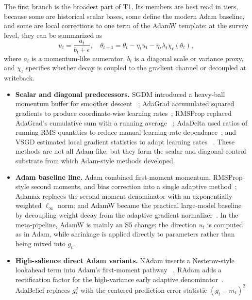 The first branch is the broadest part of T1.  Its members are best read in
tiers, because some are historical scalar bases, some define the modern Adam
baseline, and some are local corrections to one term of the AdamW template:
at the survey level, they can be summarized as
\begin{equation}
  u_t = \frac{a_t}{b_t+\epsilon}, \quad
  \theta_{t+1} = \theta_t - \eta_t u_t - \eta_t \lambda_t \chi_t(\theta_t),
  \label{eq:t1-direct-variant-template}
\end{equation}
where $a_t$ is a momentum-like numerator, $b_t$ is a diagonal scale or
variance proxy, and $\chi_t$ specifies whether decay is coupled to the
gradient channel or decoupled at writeback.
\begin{itemize}
  \setlength{\itemsep}{2pt}
  \item \textbf{Scalar and diagonal predecessors.}  SGDM introduced a
  heavy-ball momentum buffer for smoother descent
  ~\citep{polyak1964some,sutskever2013importance}; AdaGrad accumulated squared
  gradients to produce coordinate-wise learning rates~\citep{duchi2011adaptive};
  RMSProp replaced AdaGrad's cumulative sum with a running average
  ~\citep{tieleman2012rmsprop}; AdaDelta used ratios of running RMS quantities
  to reduce manual learning-rate dependence~\citep{zeiler2012adadelta}; and
  VSGD estimated local gradient statistics to adapt learning rates
  ~\citep{schaul2013nomore}.  These methods are not all Adam-like, but they
  form the scalar and diagonal-control substrate from which Adam-style methods
  developed.
  \item \textbf{Adam baseline line.}  Adam combined first-moment momentum,
  RMSProp-style second moments, and bias correction into a single adaptive
  method~\citep{kingma2015adam}; Adamax replaces the second-moment denominator
  with an exponentially weighted $\ell_\infty$ norm; and AdamW became the
  practical large-model baseline by decoupling weight decay from the adaptive
  gradient normalizer~\citep{loshchilov2019decoupled}.  In the meta-pipeline,
  AdamW is mainly an S5 change: the direction $u_t$ is computed as in Adam,
  while shrinkage is applied directly to parameters rather than being mixed
  into $g_t$.
  \item \textbf{High-salience direct Adam variants.}  NAdam inserts a
  Nesterov-style lookahead term into Adam's first-moment pathway
  ~\citep{dozat2016nadam}.  RAdam adds a rectification factor for the
  high-variance early adaptive denominator~\citep{liu2020radam}.  AdaBelief
  replaces $g_t^2$ with the centered prediction-error statistic $(g_t-m_t)^2$

\end{itemize}
